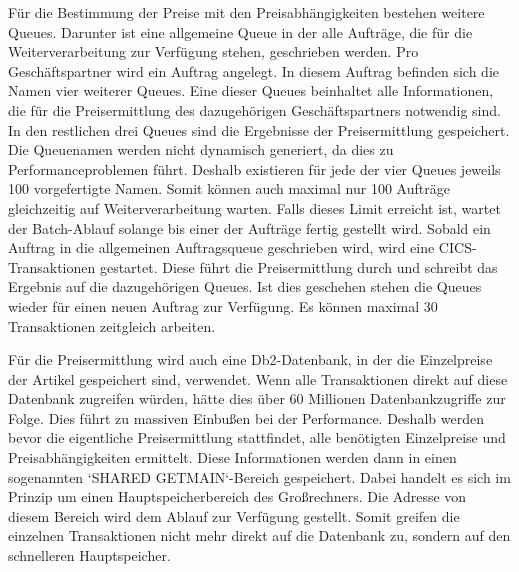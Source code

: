 Für die Bestimmung der Preise mit den Preisabhängigkeiten bestehen weitere Queues.
Darunter ist eine allgemeine Queue in der alle Aufträge, die für die Weiterverarbeitung zur Verfügung stehen, geschrieben werden.
Pro Geschäftspartner wird ein Auftrag angelegt.
In diesem Auftrag befinden sich die Namen vier weiterer Queues.
Eine dieser Queues beinhaltet alle Informationen, die für die Preisermittlung des dazugehörigen Geschäftspartners notwendig sind.
In den restlichen drei Queues sind die Ergebnisse der Preisermittlung gespeichert.
Die Queuenamen werden nicht dynamisch generiert, da dies zu Performanceproblemen führt.
Deshalb existieren für jede der vier Queues jeweils 100 vorgefertigte Namen.
Somit können auch maximal nur 100 Aufträge gleichzeitig auf Weiterverarbeitung warten.
Falls dieses Limit erreicht ist, wartet der Batch-Ablauf solange bis einer der Aufträge fertig gestellt wird.
Sobald ein Auftrag in die allgemeinen Auftragsqueue geschrieben wird, wird eine CICS-Transaktionen gestartet.
Diese führt die Preisermittlung durch und schreibt das Ergebnis auf die dazugehörigen Queues.
Ist dies geschehen stehen die Queues wieder für einen neuen Auftrag zur Verfügung.
Es können maximal 30 Transaktionen zeitgleich arbeiten.

Für die Preisermittlung wird auch eine Db2-Datenbank, in der die Einzelpreise der Artikel gespeichert sind, verwendet.
Wenn alle Transaktionen direkt auf diese Datenbank zugreifen würden, hätte dies über 60 Millionen Datenbankzugriffe zur Folge.
Dies führt zu massiven Einbußen bei der Performance.
Deshalb werden bevor die eigentliche Preisermittlung stattfindet, alle benötigten Einzelpreise und Preisabhängigkeiten ermittelt.
Diese Informationen werden dann in einen sogenannten `SHARED GETMAIN`-Bereich gespeichert.
Dabei handelt es sich im Prinzip um einen Hauptspeicherbereich des Großrechners.
Die Adresse von diesem Bereich wird dem Ablauf zur Verfügung gestellt.
Somit greifen die einzelnen Transaktionen nicht mehr direkt auf die Datenbank zu, sondern auf den schnelleren Hauptspeicher.


